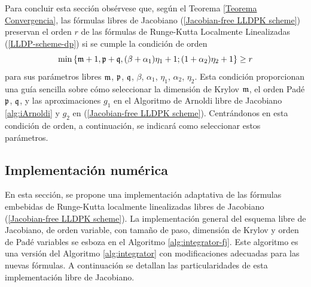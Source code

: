 Para concluir esta sección obsérvese que, según el Teorema \ref{Teorema Convergencia}, las fórmulas libres de Jacobiano (\ref{Jacobian-free LLDPK scheme})
preservan el orden $r$ de las fórmulas de Runge-Kutta Localmente Linealizadas (\ref{LLDP-scheme-dp}) si se cumple la condición de orden
\begin{equation}
\min\left\{  \mathfrak{m} + 1, \mathfrak{p}+\mathfrak{q}, (\beta+\alpha_1)\eta_1+1; (1 + \alpha_2) \eta_2 + 1 \right\}\geq r \label{fj-order-condition}
\end{equation}
para sus parámetros libres $\mathfrak{m}$, $\mathfrak{p}$, $\mathfrak{q}$, $\beta$, $\alpha_1$, $\eta_1$, $\alpha_2$, $\eta_2$. Esta condición proporcionan una guía sencilla sobre cómo
seleccionar la dimensión de Krylov $\mathfrak{m}$, el orden Padé $\mathfrak{p}$, $\mathfrak{q}$, y las aproximaciones $g_1$ en el Algoritmo de Arnoldi libre de Jacobiano \ref{alg:iArnoldi} y $g_2$ en (\ref{Jacobian-free LLDPK scheme}). Centrándonos en esta condición de orden, a continuación, se indicará como seleccionar estos parámetros.

\subsection{Implementación numérica}\label{sec:fj-num-impl}

En esta sección, se propone una implementación adaptativa de las fórmulas embebidas de Runge-Kutta localmente linealizadas libres de Jacobiano (\ref{Jacobian-free LLDPK scheme}). La implementación general del esquema libre de Jacobiano, de orden variable, con tamaño de paso, dimensión de Krylov y orden de Padé variables se esboza en el Algoritmo \ref{alg:integrator-fj}. Este algoritmo es una versión del Algoritmo \ref{alg:integrator} con modificaciones adecuadas para las nuevas fórmulas. A continuación se detallan las particularidades de esta implementación libre de Jacobiano.

